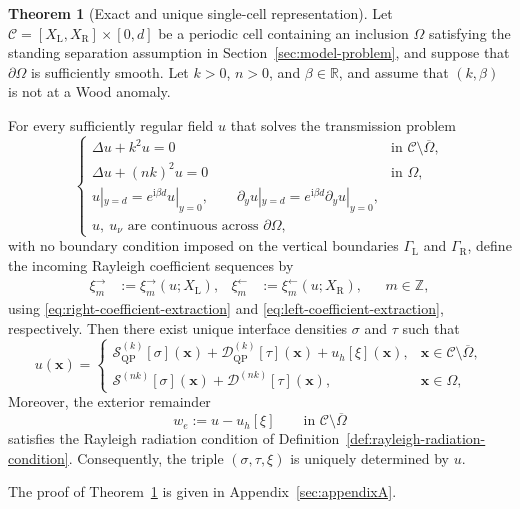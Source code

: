 \documentclass[11pt,fleqn]{article}
\newcommand{\ii}{\mathrm{i}}
\theoremstyle{definition}
\newtheorem{theorem}{Theorem}
\theoremstyle{remark}
\begin{document}
\begin{theorem}[Exact and unique single-cell representation]
\label{thm:single-cell-representation}
Let
$
  \mathcal C=[X_\mathrm{L},X_\mathrm{R}]\times[0,d]
$
be a periodic cell containing an inclusion $\Omega$ satisfying the standing
separation assumption in Section~\ref{sec:model-problem}, and suppose that
\(\partial\Omega\) is sufficiently smooth. Let \(k>0\), \(n>0\), and
\(\beta\in\mathbb R\), and assume that $(k,\beta)$ is not at a Wood anomaly.

For every sufficiently regular field $u$ that solves the transmission problem
\[
\begin{cases}
\Delta u+k^2u=0
& \text{in }\mathcal C\setminus\overline{\Omega},\\
\Delta u+(nk)^2u=0
& \text{in }\Omega,\\
u|_{y=d}=e^{\ii\beta d}u|_{y=0},
\qquad
\partial_yu|_{y=d}
=e^{\ii\beta d}\partial_yu|_{y=0},\\
u,\ u_\nu \text{ are continuous across }\partial\Omega,
\end{cases}
\]
with no boundary condition imposed on the vertical boundaries
$\Gamma_\mathrm{L}$ and $\Gamma_\mathrm{R}$, define the incoming Rayleigh
coefficient sequences by
\begin{align*}
  \xi_m^\rightarrow
  &:=\xi_m^\rightarrow(u;X_\mathrm{L}),
  &\xi_m^\leftarrow
  &:=\xi_m^\leftarrow(u;X_\mathrm{R}),
  &&m\in\mathbb Z,
\end{align*}
using \eqref{eq:right-coefficient-extraction} and
\eqref{eq:left-coefficient-extraction}, respectively. Then there exist unique
interface densities \(\sigma\) and \(\tau\) such that
\[
  u(\mathbf{x}) = \begin{cases}
    \mathcal{S}^{(k)}_{\mathrm{QP}}[\sigma](\mathbf{x}) + \mathcal{D}^{(k)}_{\mathrm{QP}}[\tau](\mathbf{x}) + u_h[\xi](\mathbf{x}), & \mathbf{x} \in \mathcal{C}\setminus \overline{\Omega},\\
    \mathcal{S}^{(nk)}[\sigma](\mathbf{x}) + \mathcal{D}^{(nk)}[\tau](\mathbf{x}), & \mathbf{x} \in \Omega,
  \end{cases}
\]
Moreover, the exterior remainder
\[
  w_e:=u-u_h[\xi]
  \qquad\text{in }\mathcal C\setminus\overline\Omega
\]
satisfies the Rayleigh radiation condition of
Definition~\ref{def:rayleigh-radiation-condition}. Consequently, the triple
\((\sigma,\tau,\xi)\) is uniquely determined by \(u\).
\end{theorem}
The proof of Theorem~\ref{thm:single-cell-representation} is given in Appendix~\ref{sec:appendixA}.
\end{document}
